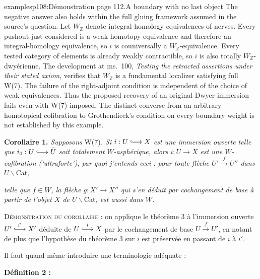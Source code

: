 \begin{dcomment}{examples}{p108:Démonstration page 112.}{A boundary with no last object}
The negative answer also holds within the full gluing framework assumed in the source's question. Let $W_{\mathbb Z}$ denote integral-homology equivalences of nerves. Every pushout just considered is a weak homotopy equivalence and therefore an integral-homology equivalence, so $i$ is couniversally a $W_{\mathbb Z}$-equivalence. Every tested category of elements is already weakly contractible, so $i$ is also totally $W_{\mathbb Z}$-dwyérienne. The development at ms.~100, \emph{Testing the retracted assertions under their stated axiom}, verifies that $W_{\mathbb Z}$ is a fundamental localizer satisfying full W(7). The failure of the right-adjoint condition is independent of the choice of weak equivalences. Thus the proposed recovery of an original Dwyer immersion fails even with W(7) imposed. The distinct converse from an arbitrary homotopical cofibration to Grothendieck's condition on every boundary weight is not established by this example.
\end{dcomment}


\textbf{Corollaire 1.} \textit{Supposons} W(7)\textit{. Si $i:U\hra X$ est une immersion ouverte telle que $i_0:U\hra\bar{U}$ soit totalement} \textit{$W$-asphérique, alors $i:U\longrightarrow X$ est une $W$-cofibration (`ultraforte'), par quoi j'entends ceci : pour toute flèche $U'\xrightarrow{f}U''$ dans $U\backslash$}Cat\textit{,}


\textit{telle que $f\in W$, la flèche $g:X'\longrightarrow X''$ qui s'en déduit par cochangement de base à partir de l'objet $X$ de $U\backslash$}Cat\textit{, est aussi dans $W$.}

\textsc{Démonstration du corollaire} : on applique le théorème 3 à l'immersion ouverte $U'\overset{i'}{\hra}X'$ déduite de $U\overset{i}{\hra}X$ par le cochangement de base $U\xrightarrow{f}U'$, en notant de plus que l'hypothèse du théorème 3 sur $i$ est préservée en passant de $i$ à $i'$.

Il faut quand même introduire une terminologie adéquate :

\textbf{Définition 2 :}


